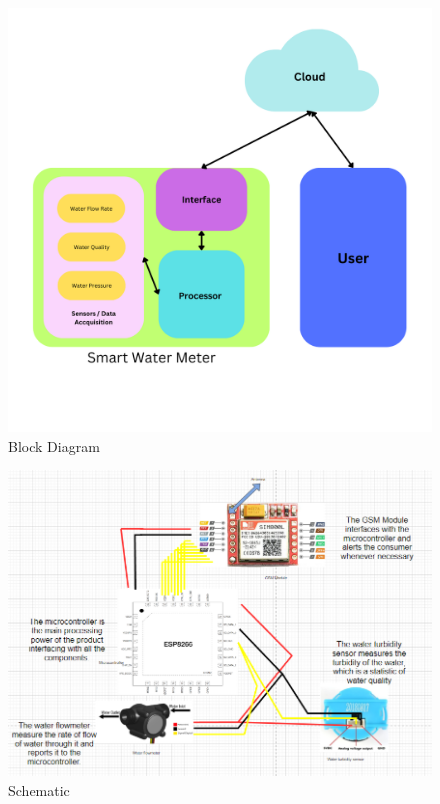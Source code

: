 \begin{figure}[h]
	\centering
	\includegraphics*[scale=0.4]{Smart Water Meter.png}
	\caption{Block Diagram}
	
	\end{figure}
\begin{figure}[h]
	\centering
	\includegraphics*[scale=0.8]{eoijf.png}
	\caption{Schematic}
	
	\end{figure}
